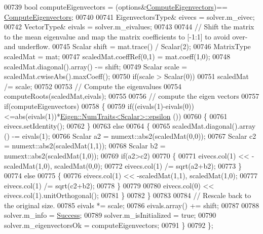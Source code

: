 \begin{DoxyCode}
00739     \textcolor{keywordtype}{bool} computeEigenvectors = (options&\hyperlink{group__enums_ggae3e239fb70022eb8747994cf5d68b4a9ada93d8885bde32b876ba4af01d3292cc}{ComputeEigenvectors})==
      \hyperlink{group__enums_ggae3e239fb70022eb8747994cf5d68b4a9ada93d8885bde32b876ba4af01d3292cc}{ComputeEigenvectors};
00740     
00741     EigenvectorsType& eivecs = solver.m\_eivec;
00742     VectorType& eivals = solver.m\_eivalues;
00743   
00744     \textcolor{comment}{// Shift the matrix to the mean eigenvalue and map the matrix coefficients to [-1:1] to avoid over- and
       underflow.}
00745     Scalar shift = mat.trace() / Scalar(2);
00746     MatrixType scaledMat = mat;
00747     scaledMat.coeffRef(0,1) = mat.coeff(1,0);
00748     scaledMat.diagonal().array() -= shift;
00749     Scalar scale = scaledMat.cwiseAbs().maxCoeff();
00750     \textcolor{keywordflow}{if}(scale > Scalar(0))
00751       scaledMat /= scale;
00752 
00753     \textcolor{comment}{// Compute the eigenvalues}
00754     computeRoots(scaledMat,eivals);
00755 
00756     \textcolor{comment}{// compute the eigen vectors}
00757     \textcolor{keywordflow}{if}(computeEigenvectors)
00758     \{
00759       \textcolor{keywordflow}{if}((eivals(1)-eivals(0))<=abs(eivals(1))*\hyperlink{group___core___module_struct_eigen_1_1_num_traits}{Eigen::NumTraits<Scalar>::epsilon}
      ())
00760       \{
00761         eivecs.setIdentity();
00762       \}
00763       \textcolor{keywordflow}{else}
00764       \{
00765         scaledMat.diagonal().array () -= eivals(1);
00766         Scalar a2 = numext::abs2(scaledMat(0,0));
00767         Scalar c2 = numext::abs2(scaledMat(1,1));
00768         Scalar b2 = numext::abs2(scaledMat(1,0));
00769         \textcolor{keywordflow}{if}(a2>c2)
00770         \{
00771           eivecs.col(1) << -scaledMat(1,0), scaledMat(0,0);
00772           eivecs.col(1) /= sqrt(a2+b2);
00773         \}
00774         \textcolor{keywordflow}{else}
00775         \{
00776           eivecs.col(1) << -scaledMat(1,1), scaledMat(1,0);
00777           eivecs.col(1) /= sqrt(c2+b2);
00778         \}
00779 
00780         eivecs.col(0) << eivecs.col(1).unitOrthogonal();
00781       \}
00782     \}
00783 
00784     \textcolor{comment}{// Rescale back to the original size.}
00785     eivals *= scale;
00786     eivals.array() += shift;
00787 
00788     solver.m\_info = \hyperlink{group__enums_gga85fad7b87587764e5cf6b513a9e0ee5ea52581b035f4b59c203b8ff999ef5fcea}{Success};
00789     solver.m\_isInitialized = \textcolor{keyword}{true};
00790     solver.m\_eigenvectorsOk = computeEigenvectors;
00791   \}
00792 \};

\end{DoxyCode}
